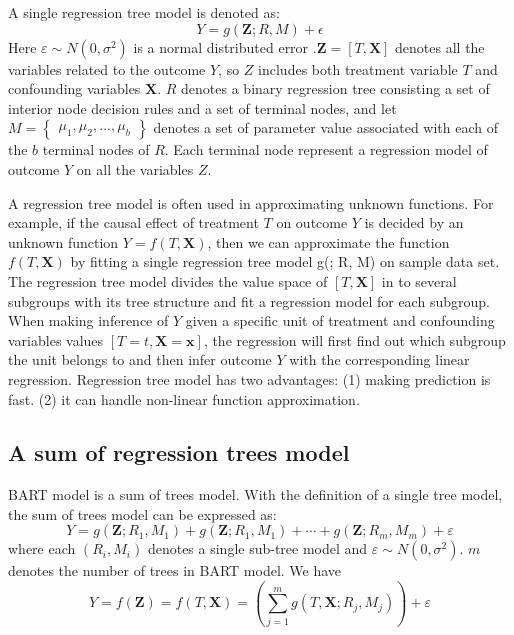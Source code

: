 A single regression tree model is denoted as:
\begin{equation*}
Y=g(\pmb{Z}; R, M)+\epsilon
\end{equation*}
Here $\varepsilon  \sim N(0,{\sigma ^2})$ is a normal distributed error .$\pmb{Z}=[T,\pmb{X}]$ denotes all the variables related to the outcome $Y$, so $Z$ includes both treatment variable $T$ and confounding variables $\pmb{X}$. $R$ denotes a binary regression tree consisting a set of interior node decision rules and a set of terminal nodes, and let $M=
\begin{Bmatrix}
 \mu _1, \mu _2, . . ., \mu _b
\end{Bmatrix}$
denotes a set of parameter value associated with each of the $b$ terminal nodes of $R$. Each terminal node represent a regression model of outcome $Y$ on all the variables $Z$.

A regression tree model is often used in approximating unknown functions. For example, if the causal effect of treatment $T$ on outcome $Y$ is decided by an unknown function $Y=f(T,\pmb{X})$, then we can approximate the function $f(T,\pmb{X})$ by fitting a single regression tree model g(; R, M) on sample data set. The regression tree model divides the value space of $[T,\pmb{X}]$ in to several subgroups with its tree structure and fit a regression model for each subgroup. When making inference of $Y$ given a specific unit of treatment and confounding variables values $[T=t,\pmb{X}=\pmb{x}]$, the regression will first find out which subgroup the unit belongs to and then infer outcome $Y$ with the corresponding linear regression. Regression tree model has two advantages: (1) making prediction is fast. (2) it can handle non-linear function approximation.


\subsection{A sum of regression trees model}
BART model is a sum of trees model. With the definition of a single tree model, the sum of trees model can be expressed as:
\begin{equation*}
Y = g(\pmb{Z};{R_1},{M_1}) + g(\pmb{Z};{R_1},{M_1}) +  \cdots  + g(\pmb{Z};{R_m},{M_m}) + \varepsilon
\end{equation*}
where each $(R_i,M_i)$ denotes a single sub-tree model and $\varepsilon  \sim N(0,{\sigma ^2})$.  $m$ denotes the number of trees in BART model. We have
 \begin{equation*}
 Y =f(\pmb{Z})=f(T,\pmb{X})= \left( {\sum\limits_{j = 1}^m {g(T,\pmb{X};{R_j},{M_j})} } \right) + \varepsilon
 \end{equation*}

